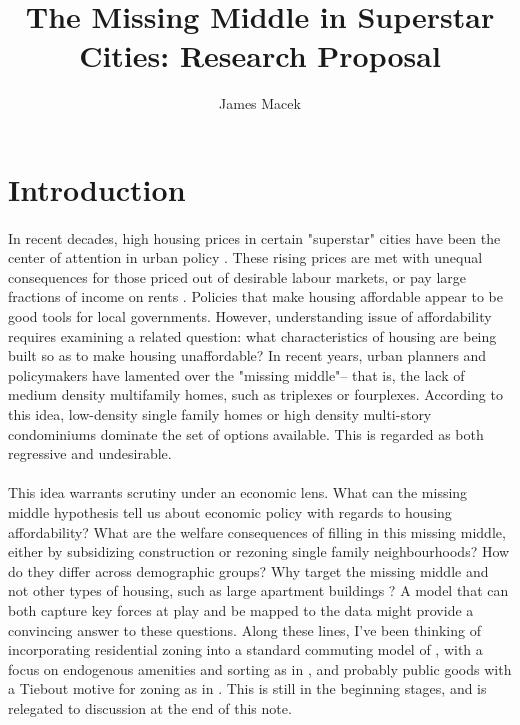 \documentclass[]{article}
\title{The Missing Middle in Superstar Cities: Research Proposal}
\author{James Macek}
\theoremstyle{plain}
\begin{document}
\maketitle

\section{Introduction}
\paragraph*{}
In recent decades, high housing prices in certain "superstar" cities have been the center of attention in urban policy \citep{superstarcities}. These rising prices are met with unequal consequences for those priced out of desirable labour markets, or pay large fractions of income on rents \citep{nonhomo}. Policies that make housing affordable appear to be good tools for local governments. However, understanding issue of affordability requires examining a related question: what characteristics of housing are being built so as to make housing unaffordable? In recent years, urban planners and policymakers have lamented over the "missing middle"-- that is, the lack of medium density multifamily homes, such as triplexes or fourplexes. According to this idea, low-density single family homes or high density multi-story condominiums dominate the set of options available. This is regarded as both regressive and undesirable.
\paragraph*{}
This idea warrants scrutiny under an economic lens. What can the missing middle hypothesis tell us about economic policy with regards to housing affordability? What are the welfare consequences of filling in this missing middle, either by subsidizing construction or rezoning single family neighbourhoods? How do they differ across demographic groups? Why target the missing middle and not other types of housing, such as large apartment buildings \citep{asquithetallocaleffects}? A model that can both capture key forces at play and be mapped to the data might provide a convincing answer to these questions. Along these lines, I've been thinking of incorporating residential zoning into a standard commuting model of \citet{berlinwall}, with a focus on endogenous amenities and sorting as in \citet{Coutureetal}, and probably public goods with a Tiebout motive for zoning as in \cite{hamilton1976}. This is still in the beginning stages, and is relegated to discussion at the end of this note. 
\end{document}
